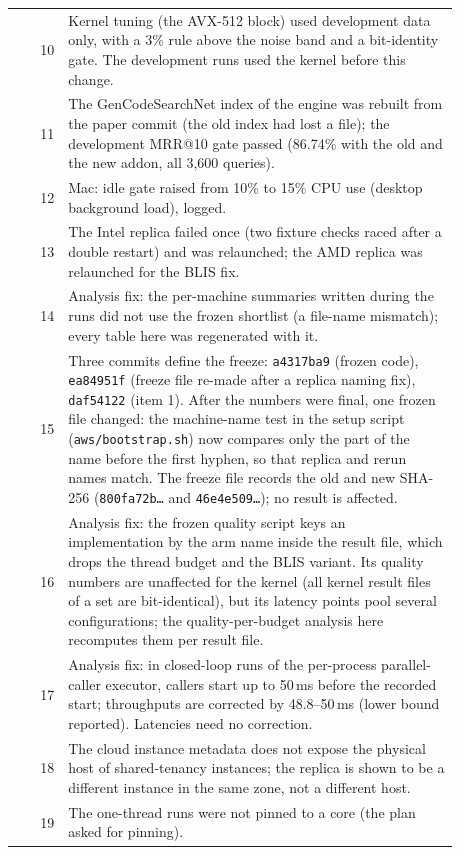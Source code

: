 \begin{small}
\begin{longtable}{rp{0.88\linewidth}}
10 & Kernel tuning (the AVX-512 block) used development data only, with a 3\% rule above the noise band and a bit-identity gate. The development runs used the kernel before this change. \\
11 & The GenCodeSearchNet index of the engine was rebuilt from the paper commit (the old index had lost a file); the development MRR@10 gate passed (86.74\% with the old and the new addon, all 3,600 queries). \\
12 & Mac: idle gate raised from 10\% to 15\% CPU use (desktop background load), logged. \\
13 & The Intel replica failed once (two fixture checks raced after a double restart) and was relaunched; the AMD replica was relaunched for the BLIS fix. \\
14 & Analysis fix: the per-machine summaries written during the runs did not use the frozen shortlist (a file-name mismatch); every table here was regenerated with it. \\
15 & Three commits define the freeze: \texttt{a4317ba9} (frozen code), \texttt{ea84951f} (freeze file re-made after a replica naming fix), \texttt{daf54122} (item 1). After the numbers were final, one frozen file changed: the machine-name test in the setup script (\texttt{aws/bootstrap.sh}) now compares only the part of the name before the first hyphen, so that replica and rerun names match. The freeze file records the old and new SHA-256 (\texttt{800fa72b\ldots} and \texttt{46e4e509\ldots}); no result is affected. \\
16 & Analysis fix: the frozen quality script keys an implementation by the arm name inside the result file, which drops the thread budget and the BLIS variant. Its quality numbers are unaffected for the kernel (all kernel result files of a set are bit-identical), but its latency points pool several configurations; the quality-per-budget analysis here recomputes them per result file. \\
17 & Analysis fix: in closed-loop runs of the per-process parallel-caller executor, callers start up to 50\,ms before the recorded start; throughputs are corrected by 48.8--50\,ms (lower bound reported). Latencies need no correction. \\
18 & The cloud instance metadata does not expose the physical host of shared-tenancy instances; the replica is shown to be a different instance in the same zone, not a different host. \\
19 & The one-thread runs were not pinned to a core (the plan asked for pinning). \\

\end{longtable}
\end{small}
